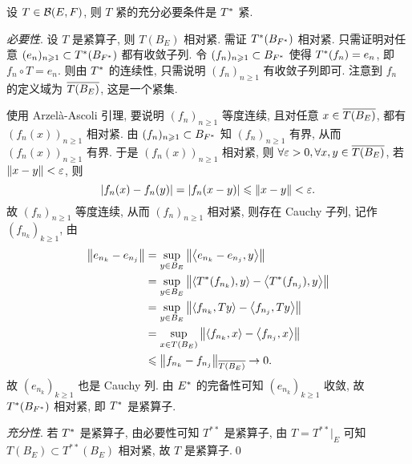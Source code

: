 \begin{Theorem}
	设 $ T\in\CB(E, F) $, 则 $ T $ 紧的充分必要条件是 $ \Star{T} $ 紧.
\end{Theorem}
\begin{Proof}
	\textsl{必要性}. 设 $ T $ 是紧算子, 则 $ T(B_{E}) $ 相对紧. 需证 $ \Star{T}(B_{\Star{F}}) $ 相对紧. 只需证明对任意 $ (e_{n})_{n\geqslant1}\subset \Star{T}(B_{\Star{F}}) $ 都有收敛子列. 令 $ (f_{n})_{n\geqslant1}\subset B_{\Star{F}} $ 使得 $ \Star{T}(f_{n})=e_{n} $, 即 $ f_{n}\circ T=e_{n} $. 则由 $ \Star{T} $ 的连续性, 只需说明 $ (f_{n})_{n\geqslant1} $ 有收敛子列即可. 注意到 $ f_{n} $ 的定义域为 $ \baro{T(B_{E})} $, 这是一个紧集.

	使用 Arzel\`a-Ascoli 引理, 要说明 $ (f_{n})_{n\geqslant1} $ 等度连续, 且对任意 $ x\in\baro{T(B_{E})} $, 都有 $ (f_{n}(x))_{n\geqslant1} $ 相对紧. 由 $ (f_{n})_{n\geqslant1}\subset B_{\Star{F}} $ 知 $ (f_{n})_{n\geqslant1} $ 有界, 从而 $ (f_{n}(x))_{n\geqslant1} $ 有界. 于是 $ (f_{n}(x))_{n\geqslant1} $ 相对紧, 则 $ \forall\varepsilon>0, \forall x, y\in\baro{T(B_{E})} $, 若 $ \norm{x-y}<\varepsilon $, 则
	\[
		\abs{f_{n}(x)-f_{n}(y)} = \abs{f_{n}(x-y)}\leqslant\norm{x-y}<\varepsilon.
	\]
	故 $ (f_{n})_{n\geqslant1} $ 等度连续, 从而 $ (f_{n})_{n\geqslant1} $ 相对紧, 则存在 Cauchy 子列,
	记作 $ (f_{n_{k}})_{k\geqslant1} $, 由
	\[
		\begin{aligned}
			\norm{e_{n_{k}}-e_{n_{j}}} & = \sup_{y\in B_{E}}\norm{\lrangle{e_{n_{k}}-e_{n_{j}}, y}}                                  \\
			                           & = \sup_{y\in B_{E}}\norm{\lrangle{\Star{T}(f_{n_{k}}), y}-\lrangle{\Star{T}(f_{n_{j}}), y}} \\
			                           & = \sup_{y\in B_{E}}\norm{\lrangle{f_{n_{k}}, Ty}-\lrangle{f_{n_{j}}, Ty}}                   \\
			                           & =  \sup_{x\in T(B_{E})}\norm{\lrangle{f_{n_{k}}, x}-\lrangle{f_{n_{j}}, x}}                 \\
			                           & \leqslant \norm{f_{n_{k}}-f_{n_{j}}}_{\baro{T(B_{E})}}\to 0.
		\end{aligned}
	\]
	故 $ (e_{n_{k}})_{k\geqslant1} $ 也是 Cauchy 列. 由 $ \Star{E} $ 的完备性可知 $ (e_{n_{k}})_{k\geqslant1} $ 收敛, 故 $ \Star{T}(B_{\Star{F}}) $ 相对紧, 即 $ \Star{T} $ 是紧算子.

	\textsl{充分性}. 若 $ \Star{T} $ 是紧算子, 由必要性可知 $ T^{**} $ 是紧算子, 由 $ T = T^{**}|_{E} $ 可知 $ T(B_{E})\subset T^{**}(B_{E}) $ 相对紧, 故 $ T $ 是紧算子.\qed
\end{Proof}

